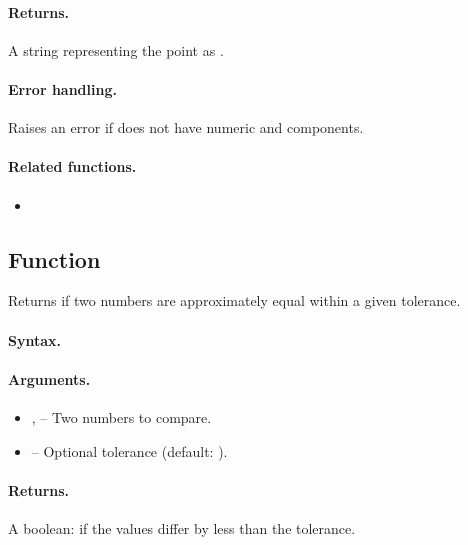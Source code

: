 \paragraph{Returns.}
A string representing the point as .

\paragraph{Error handling.}
Raises an error if  does not have numeric  and  components.

\paragraph{Related functions.}
\begin{itemize}
\item {}
\end{itemize}

\subsection{Function }
\label{sub:function_utils_almost_equal}

Returns  if two numbers are approximately equal within a given tolerance.

\paragraph{Syntax.}
\begin{center}
\end{center}

\paragraph{Arguments.}
\begin{itemize}
\item {},  – Two numbers to compare.
\item {} – Optional tolerance (default: ).
\end{itemize}

\paragraph{Returns.}
A boolean:  if the values differ by less than the tolerance.



